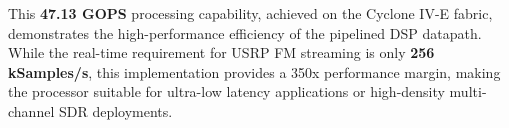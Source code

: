 This \textbf{47.13 GOPS} processing capability, achieved on the Cyclone IV-E fabric, demonstrates the high-performance efficiency of the pipelined DSP datapath. While the real-time requirement for USRP FM streaming is only \textbf{256 kSamples/s}, this implementation provides a 350x performance margin, making the processor suitable for ultra-low latency applications or high-density multi-channel SDR deployments.


